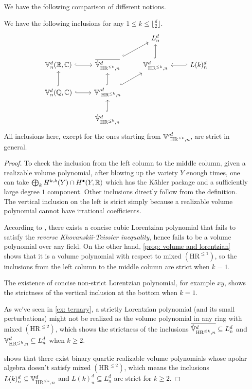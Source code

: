 We have the following comparison of different notions.
\begin{proposition}
    We have the following inclusions for any $1\leq k\leq \lfloor\frac{d}{2}\rfloor$.
    \[\begin{tikzcd}
	 & & L^d_n & \\
	 \Bbb V^d_n(\R,\Bbb C) & \overline{\mathring{\Bbb V}^d_{\text{HR}^{\leq k},n}} & {\Bbb V}^d_{\text{HR}^{\leq k},n} & L(k)^d_n \\
    \Bbb V^d_n(\Q,\Bbb C) & {\Bbb V'}^d_{\text{HR}^{\leq k},n} & & \\
	& \mathring{\Bbb V}^d_{\text{HR}^{\leq k},n}
	\arrow[hook, from=2-1, to=2-2]
	\arrow[hook, from=2-2, to=1-3]
	\arrow[hook, from=2-3, to=1-3]
	\arrow[hook', from=2-4, to=2-3]
	\arrow[hook, from=3-1, to=2-1]
    \arrow[hook, from=3-1, to=3-2]
	\arrow[hook, from=3-2, to=2-2]
	\arrow[hook, from=3-2, to=2-3]
	\arrow[hook, from=4-2, to=3-2]
\end{tikzcd}\]
All inclusions here, except for the ones starting from ${\Bbb V'}^d_{\text{HR}^{\leq k},n}$, are strict in general.
\end{proposition}

\begin{proof}
    To check the inclusion from the left column to the middle column, given a realizable volume polynomial, after blowing up the variety $Y$ enough times, one can take $\bigoplus_kH^{k,k}(Y)\cap H^\bullet(Y,\mathbb{R})$ which has the K\"ahler package and a sufficiently large degree $1$ component. Other inclusions directly follow from the definition. The vertical inclusion on the left is strict simply because a realizable volume polynomial cannot have irrational coefficients.

    According to \cite[Footnote 15]{BH20}, there exists a concise cubic Lorentzian polynomial that fails to satisfy the \textit{reverse Khovanskii-Teissier inequality}, hence fails to be a volume polynomial over any field. On the other hand, \cref{prop: volume and lorentzian} shows that it is a volume polynomial with respect to mixed $(\text{HR}^{\leq 1})$, so the inclusions from the left column to the middle column are strict when $k=1$.
    
    The existence of concise non-strict Lorentzian polynomial, for example $xy$, shows the strictness of the vertical inclusion at the bottom when $k=1$.

    As we've seen in \cref{ex: ternary}, a strictly Lorentzian polynomial (and its small perturbations) might not be realized as the volume polynomial in any ring with mixed $(\text{HR}^{\leq 2})$, which shows the strictness of the inclusions $\overline{\mathring{\Bbb V}^d_{\text{HR}^{\leq k},n}} \subseteq L^d_n$ and ${\Bbb V}^d_{\text{HR}^{\leq k},n} \subseteq L^d_n$ when $k\geq 2$.

    \cite[Example 6.17]{NW26} shows that there exist binary quartic realizable volume polynomials whose apolar algebra doesn't satisfy mixed $(\text{HR}^{\leq 2})$, which means the inclusions $L(k)^d_n\subseteq {\Bbb V}^d_{\text{HR}^{\leq k},n}$ and $L(k)^d_n\subseteq L^d_n$ are strict for $k\geq 2$.
\end{proof}

